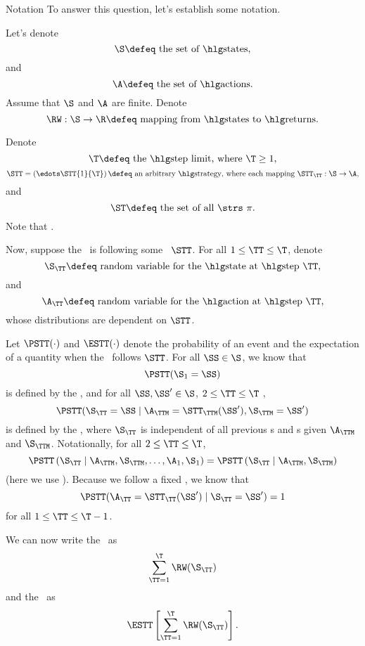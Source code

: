 \begin{part}{Notation}
  To answer this question, let's establish some notation.

  Let's denote
  $$\text{$\S \defeq$ the set of \til{}s},$$
  and 
  $$\text{$\A \defeq$ the set of \act{}s.}$$
  Assume that $\S$ and $\A$ are finite.
  Denote
  $$\text{$\RW : \S \rightarrow \R \defeq$ mapping from \til{}s to \rwd{}s.}$$

  Denote
  $$\text{$\T \defeq$ the \lmt, where $\T \ge 1$},$$
  $$\text{$\STT = \left(\edots\STT{1}{\T}\right) \defeq$ an arbitrary \str, 
  where each mapping $\STT_\TT : \S \rightarrow \A$},$$
  and
  $$\text{$\ST \defeq$ the set of all \strs\ $\pi$}.$$
  Note that .

  Now, suppose the \agt\ is following some \str\ $\STT$.
  For all $1 \le \TT \le \T$,
  denote
  $$\text{$\S_\TT \defeq$ random variable for the \til\ at \stp\ $\TT$},$$
  and
  $$\text{$\A_\TT \defeq$ random variable for the \act\ at \stp\ $\TT$},$$
  whose distributions are dependent on $\STT$.

  Let $\PSTT(\cdot)$ and $\ESTT(\cdot)$ denote the probability of an event
  and the expectation of a quantity
  when the \agt\ follows $\STT$.
  For all $\SS \in \S$, we know that
  $$\PSTT(\S_1 = \SS)$$
  is defined by the \ind, and
  for all $\SS, \SS' \in \S$, $2 \le \TT \le \T$ 
  ,
  $$\PSTT(\S_\TT = \SS \mid \A_\TTM = \STT_\TTM(\SS'), \S_\TTM = \SS')$$
  is defined by the \trd, where 
  $\S_\TT$ is independent of all previous \til{}s and \act{}s given $\A_\TTM$ and $\S_\TTM$.
  Notationally, for all $2 \le \TT \le \T$,
  $$ 
  \PSTT\left( \S_\TT \mid \A_{\TTM}, \S_{\TTM}, \ldots, \A_{1}, \S_{1} \right)
  = 
  \PSTT\left( \S_\TT \mid \A_{\TTM}, \S_{\TTM}\right)
  $$
  (here we use ).
  Because we follow a fixed \str, we know that
  $$\PSTT(\A_\TT = \STT_\TT(\SS') \mid \S_\TT = \SS') = 1$$
  for all
  $1 \le \TT \le \T - 1$.

  We can now write the \trwd\ as
  $$\sum_{\TT = 1}^\T \RW(\S_\TT)$$
  and the \atrwd\ as
  $$\ESTT\left[\sum_{\TT = 1}^\T \RW(\S_\TT)\right].$$
\end{part}
